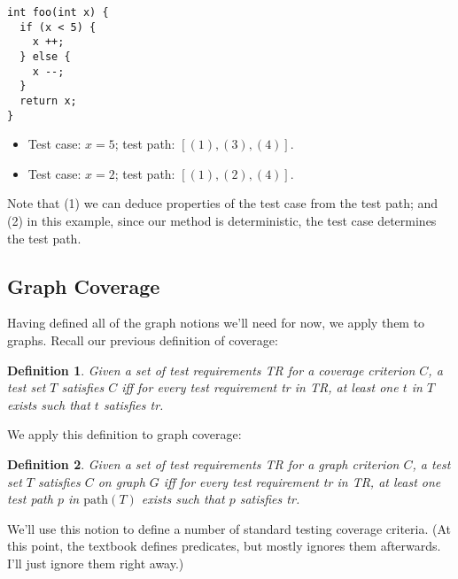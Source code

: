 \documentclass[11pt]{article}
\newtheorem{defn}{Definition}
\begin{document}
\begin{center}
\begin{minipage}{10em}
\vspace*{-8em}
\begin{lstlisting}
int foo(int x) {
  if (x < 5) {
    x ++;
  } else {
    x --;
  }
  return x;
}
\end{lstlisting}
\end{minipage}
\end{center}

\begin{itemize}
\item Test case: $x = 5$; test path: $[(1), (3), (4)]$.
\item Test case: $x = 2$; test path: $[(1), (2), (4)]$.
\end{itemize}

Note that (1) we can deduce properties of the test case from the test path; and
(2) in this example, since our method is deterministic, the test case 
determines the test path.

\subsection*{Graph Coverage}
Having defined all of the graph notions we'll need for now, we apply them to
graphs. Recall our previous definition of coverage:
\begin{defn}
Given a set of test requirements \emph{TR} for a coverage criterion $C$, 
a test set $T$ \emph{satisfies} $C$ iff for every test requirement \emph{tr} in 
\emph{TR}, at least one $t$ in $T$ exists such that $t$ satisfies \emph{tr}.
\end{defn}

We apply this definition to graph coverage:
\begin{defn}
Given a set of test requirements \emph{TR} for a graph criterion $C$, 
a test set $T$ satisfies $C$ on graph $G$ iff for every test requirement
\emph{tr} in \emph{TR}, at least one test path $p$ in $\mbox{path}(T)$ 
exists such that $p$ satisfies \emph{tr}.
\end{defn}
We'll use this notion to define a number of standard testing
coverage criteria. (At this point, the textbook defines predicates, but
mostly ignores them afterwards. I'll just ignore them right away.)
\end{document}

